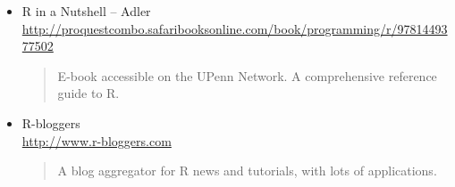 \documentclass[11pt, letterpaper]{article}
\begin{document}
\begin{itemize}
	           \item R in a Nutshell -- Adler\\ \url{http://proquestcombo.safaribooksonline.com/book/programming/r/9781449377502}         
           	\begin{quote}
           		E-book accessible on the UPenn Network. A comprehensive reference guide to R.
           	\end{quote}
		\item R-bloggers \\\url{http://www.r-bloggers.com}
		\begin{quote}
			A blog aggregator for R news and tutorials, with lots of applications.
		\end{quote}
\end{itemize}
\end{document}
